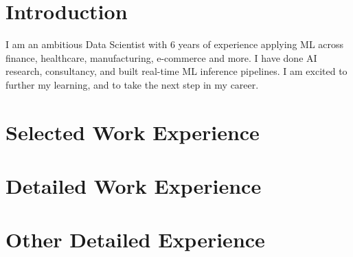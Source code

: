 \documentclass[11pt,a4paper]{moderncv}
\begin{document}
\makecvtitle

\section*{Introduction}
I am an ambitious Data Scientist with 6 years of experience applying ML across finance, healthcare, manufacturing, e-commerce and more. I have done AI research, consultancy, and built real-time ML inference pipelines. I am excited to further my learning, and to take the next step in my career.


\section{Selected Work Experience}







\newpage
\section{Detailed Work Experience}





\section{Other Detailed Experience}

\end{document}

